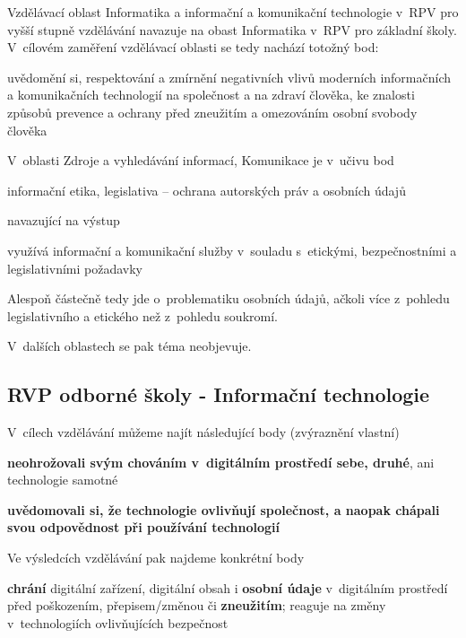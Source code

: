 Vzdělávací oblast Informatika a informační a komunikační technologie v~RPV pro vyšší stupně vzdělávání navazuje na obast Informatika v~RPV pro základní školy. V~cílovém zaměření vzdělávací oblasti se tedy nachází totožný bod:

\begin{displayquote}
uvědomění si, respektování a zmírnění negativních vlivů moderních informačních a komunikačních technologií na společnost a na zdraví člověka, ke znalosti způsobů prevence a ochrany před zneužitím a omezováním osobní svobody člověka
\end{displayquote}

V~oblasti Zdroje a vyhledávání informací, Komunikace je v~učivu bod

\begin{displayquote}informační etika, legislativa – ochrana autorských práv a osobních údajů
\end{displayquote}

navazující na výstup

\begin{displayquote}
využívá informační a komunikační služby v~souladu s~etickými, bezpečnostními a legislativními požadavky
\end{displayquote}

Alespoň částečně tedy jde o~problematiku osobních údajů, ačkoli více z~pohledu legislativního a etického než z~pohledu soukromí.

V~dalších oblastech se pak téma neobjevuje. 

\subsection{RVP odborné školy - Informační technologie}

V~cílech vzdělávání můžeme najít následující body (zvýraznění vlastní)

\begin{displayquote}
\textbf{neohrožovali svým chováním v~digitálním prostředí sebe, druhé}, ani technologie samotné
\end{displayquote}

\begin{displayquote}
\textbf{uvědomovali si, že technologie ovlivňují společnost, a naopak chápali svou odpovědnost při používání technologií}
\end{displayquote}

Ve výsledcích vzdělávání pak najdeme konkrétní body

\begin{displayquote}
\textbf{chrání} digitální zařízení, digitální obsah i \textbf{osobní údaje} v~digitálním prostředí před poškozením, přepisem/změnou či \textbf{zneužitím}; reaguje na změny v~technologiích ovlivňujících bezpečnost
\end{displayquote}

